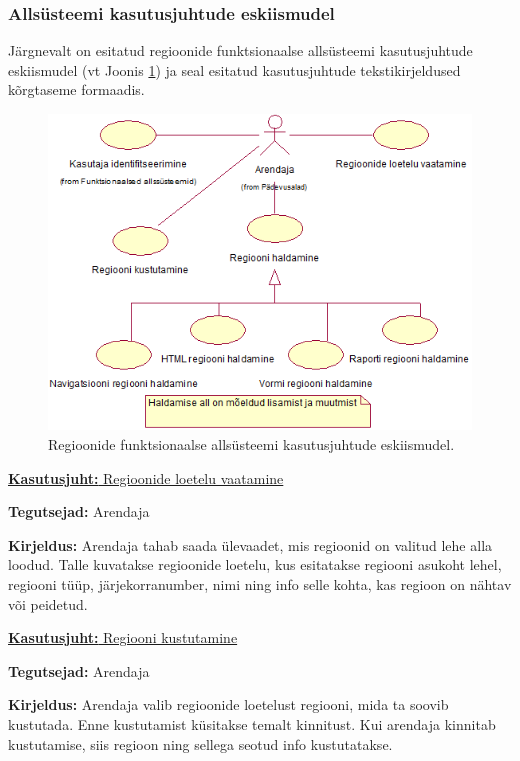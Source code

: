 \documentclass[a4paper,12pt]{article} %
\begin{document}
\subsubsection{Allsüsteemi kasutusjuhtude eskiismudel}
Järgnevalt on esitatud regioonide funktsionaalse allsüsteemi kasutusjuhtude eskiismudel (vt Joonis \ref{fig_regioonide_funktsionaalse_allsüsteemi_kasutusjuhtude_eskiismudel}) ja seal esitatud kasutusjuhtude tekstikirjeldused kõrgtaseme formaadis.
\begin{figure}[H]
\centering
\includegraphics[width=\textwidth]{./diagrams/regions-subsystem-use-case-digram.png}
\caption{Regioonide funktsionaalse allsüsteemi kasutusjuhtude eskiismudel.}
\label{fig_regioonide_funktsionaalse_allsüsteemi_kasutusjuhtude_eskiismudel}
\end{figure}
\pagebreak

\underline{\textbf{Kasutusjuht:} Regioonide loetelu vaatamine}
\par
\textbf{Tegutsejad:} Arendaja
\par
\textbf{Kirjeldus:} Arendaja tahab saada ülevaadet, mis regioonid on valitud lehe alla loodud. Talle kuvatakse regioonide loetelu, kus esitatakse regiooni asukoht lehel, regiooni tüüp, järjekorranumber, nimi ning info selle kohta, kas regioon on nähtav või peidetud.
\par

\underline{\textbf{Kasutusjuht:} Regiooni kustutamine}
\par
\textbf{Tegutsejad:} Arendaja
\par
\textbf{Kirjeldus:} Arendaja valib regioonide loetelust regiooni, mida ta soovib kustutada. Enne kustutamist küsitakse temalt kinnitust. Kui arendaja kinnitab kustutamise, siis regioon ning sellega seotud info kustutatakse.
\end{document}
